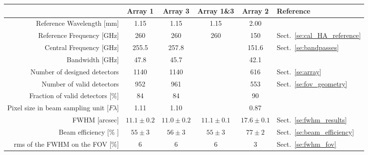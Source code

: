 \begin{table}[h]
\begin{center}    
  \begin{threeparttable}
    \begin{tabular}{|r|c|c|c|c|l|}
      \hline
      & Array 1 & Array 3  & Array 1\&3 & Array 2 & Reference \\
      \hline
      \hline
      Reference Wavelength  [mm]  &  1.15    &  1.15   & 1.15  & 2.00   &   \\
      Reference Frequency  [GHz]  &  260    &  260   & 260  & 150   &  Sect.~\ref{se:cal_HA_reference}  \\
      Central Frequency [GHz]     &  255.5  &  257.8 &      & 151.6 &  Sect.~\ref{se:bandpasses}  \\
      Bandwidth         [GHz]     &  47.8   &  45.7  &      & 42.1  &   \\
      \hline
      Number of designed detectors                   & 1140      &  1140    &    &    616  & Sect.~\ref{se:array}\\
      Number of valid detectors                      &  952      &   961    &    &    553  & Sect.~\ref{se:fov_geometry}\\
      Fraction of valid detectors [$\%$]             &  84       &   84     &    &     90  & \\
      Pixel size in beam sampling unit\tnote{(a)}\hspace{1mm} [$F\lambda$] & 1.11 & 1.10  &  &  0.87 & \\
      \hline
      FWHM\tnote{(b)}\hspace{1mm} [arcsec]    &  $11.1 \pm 0.2$   &  $11.0 \pm 0.2$  &   $11.1 \pm 0.1$  &  $17.6 \pm 0.1$  &  Sect.~\ref{se:fwhm_results}\\
      Beam efficiency\tnote{(c)}\hspace{1mm} [\% ] &  $55 \pm 3$  &  $56 \pm 3$   &  $55 \pm 3$   &  $77 \pm 2$  &  Sect.~\ref{se:beam_efficiency}\\
      rms of the FWHM on the FOV [$\%$]          &    6         &      6        &       6        &      3        & Sect.~\ref{se:fwhm_fov}\\

\end{tabular}
\end{threeparttable}
\end{center}
\end{table}
